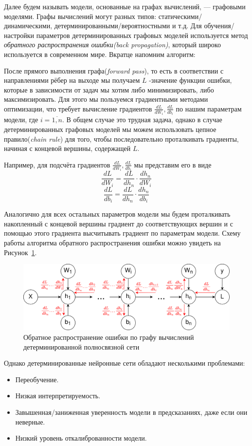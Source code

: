 \documentclass[14pt]{report}
\begin{document}
Далее будем называть модели, основанные на графах вычислений, --- графовыми моделями. Графы вычислений могут разных типов:
 статическими/динамическими, детерминированными/вероятностными и т.д. Для обучения/настройки параметров детерминированных графовых моделей
 используется метод \textit{обратного распространения ошибки(back propagation)}, который широко используется в современном мире. Вкратце напомним алгоритм:

После прямого выполнения графа(\textit{forward pass}), то есть в соответствии с направлениями рёбер на выходе мы получаем
 $L$ -значение функции ошибки, которые в зависимости от задач мы хотим либо минимизировать, либо максимизировать. Для этого
 мы пользуемся градиентными методами оптимизации, что требует вычисление градиентов $\frac{dL}{d W_i}, \frac{dL}{d b_i}$ по нашим параметрам модели, где $i = \overline{1,n}$.
 В общем случае это трудная задача, однако в случае детерминированных графовых моделей мы можем использовать цепное правило(\textit{chain rule}) для того, чтобы последовательно
 проталкивать градиенты, начиная с концевой вершины, содержащей $L$.

 Например, для подсчёта градиентов $\frac{dL}{d W_i}, \frac{dL}{d b_i}$ мы представим его в виде
 $$\frac{dL}{d W_i} = \frac{dL}{d h_n} \cdot \frac{d h_n}{d W_i}$$
 $$\frac{dL}{d b_i} = \frac{dL}{d h_n} \cdot \frac{d h_n}{d b_i}$$

Аналогично для всех остальных параметров модели мы будем проталкивать накопленный с концевой вершины градиент до соответствующих вершин и
 с помощью этого градиента высчитывать градиент по параметрам модели. Схему работы алгоритма обратного распространения ошибки
 можно увидеть на Рисунок~\ref{fig:image2}.
\begin{figure}[H]
    \centering
    \includegraphics[width=0.7\linewidth]{ANN_back_prop.png}
    \caption{Обратное распространение ошибки по графу вычислений детерминированной полносвязной сети}
    \label{fig:image2}
\end{figure}

Однако детерминированные нейронные сети обладают несколькими проблемами:
\begin{itemize}
    \item Переобучение.
    \item Низкая интерпретируемость.
    \item Завышенная/заниженная уверенность модели в предсказаниях, даже если они неверные.
    \item Низкий уровень откалиброванности модели.
\end{itemize}
\end{document}
